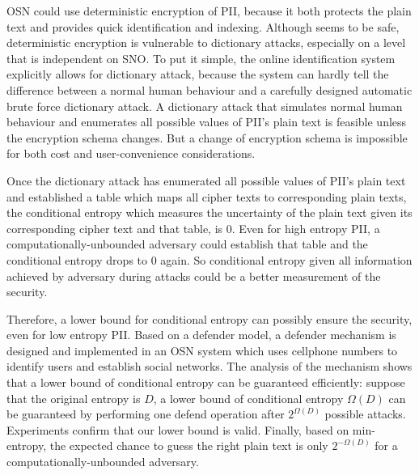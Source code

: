 \documentclass[10pt, conference, compsocconf]{IEEEtran}
\begin{document}
	
	OSN could use deterministic encryption of PII,
	because it both protects the plain text and provides quick identification
	and indexing.
	Although seems to be safe, deterministic encryption is 
	vulnerable to dictionary attacks, especially
	on a level that is independent on SNO.
	To put it simple, the online identification system explicitly
	allows for dictionary attack, because the system can hardly tell
	the difference between a normal human behaviour and a carefully 
	designed automatic brute force dictionary attack. A dictionary
	attack that simulates normal human behaviour and enumerates all
	possible values of PII's plain text is feasible unless the encryption
	schema changes. But a change of encryption schema is impossible
	for both cost and user-convenience considerations.	
	
	Once the dictionary attack has enumerated all possible values
	of PII's plain text and established a table which maps all cipher texts
	to corresponding plain texts, the conditional entropy \cite{math_book, info_measure}
	which measures the uncertainty of the plain text given
	its corresponding cipher text and that table, is $0$.
	Even for high entropy PII, a
	computationally-unbounded adversary could establish that table
	and the conditional entropy drops to $0$ again. 
	So conditional entropy given
	all information achieved by adversary during attacks
	could be a better measurement of the security.
	
	Therefore, a lower bound for conditional entropy can possibly ensure
	the security, even for low entropy PII.
	Based on a defender model, a defender mechanism is designed and implemented
	in an OSN system which uses cellphone numbers
	to identify users and establish social networks.
	The analysis of the mechanism shows that a lower bound 
	of conditional entropy can be guaranteed efficiently: suppose that the original entropy
	is $D$, a lower bound of conditional entropy $\Omega(D)$ can be guaranteed
	by performing one defend operation after $2^{\Omega(D)}$ 
	possible attacks.
	Experiments confirm that
	our lower bound is valid. Finally, based on min-entropy,
	the expected chance to guess the right plain text is only $2^{-\Omega(D)}$ for
	a computationally-unbounded adversary.
	
\end{document}
